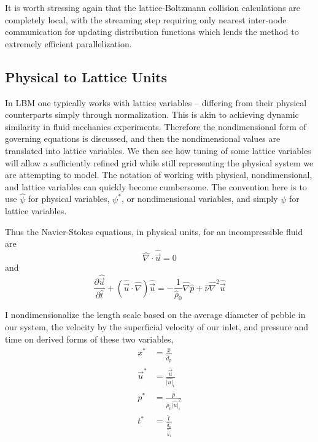 It is worth stressing again that the lattice-Boltzmann collision calculations are completely local, with the streaming step requiring only nearest inter-node communication for updating distribution functions which lends the method to extremely efficient parallelization. 






\subsection{Physical to Lattice Units}\label{sec:physical-to-lattice}
In LBM one typically works with lattice variables -- differing from their physical counterparts simply through normalization. This is akin to achieving dynamic similarity in fluid mechanics experiments. Therefore the nondimensional form of governing equations is discussed, and then the nondimensional values are translated into lattice variables. We then see how tuning of some lattice variables will allow a sufficiently refined grid while still representing the physical system we are attempting to model. The notation of working with physical, nondimensional, and lattice variables can quickly become cumbersome. The convention here is to use $\hat{\psi}$ for physical variables, $\psi^*$, or nondimensional variables, and simply $\psi$ for lattice variables.

Thus the Navier-Stokes equations, in physical units, for an incompressible fluid are
\begin{equation}
	\hat{\nabla}\cdot\hat{\vec{u}} = 0
\end{equation}
and
\begin{equation}
	\frac{\partial \hat{\vec{u}}}{\partial \hat{t}} + (\hat{\vec{u}}\cdot\hat{\nabla})\hat{\vec{u}} = -\frac{1}{\hat{\rho}_0}\hat{\nabla}\hat{p} + \hat{\nu}\hat{\nabla}^2\hat{\vec{u}}
\end{equation}

I nondimensionalize the length scale based on the average diameter of pebble in our system, the velocity by the superficial velocity of our inlet, and pressure and time on derived forms of these two variables,
\begin{subequations}
\begin{align}
	x^* &= \frac{\hat{x}}{\hat{d}_p} \\
	\vec{u}^* &= \frac{\hat{\vec{u}}}{\hat{|u|}_i} \\
	p^* &= \frac{\hat{p}}{\hat{\rho}_0\hat{|u|}_i^2}\\
	t^* &= \frac{\hat{t}}{\frac{\hat{d}_p}{\hat{\vec{u}}_i}}
\end{align}
\end{subequations}

